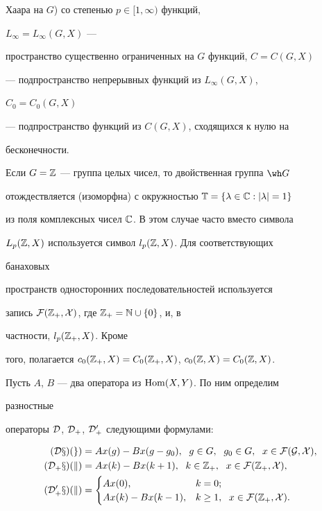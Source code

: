 Хаара на $G$) со степенью $p\in[1,\infty)$ функций, 


$L_\infty=L_\infty(G,X)$ --- 


пространство существенно ограниченных на $G$ функций, $C=C(G,X)$ 


--- подпространство непрерывных функций из $L_\infty(G,X)$, 


$C_0=C_0(G,X)$ 


--- подпространство функций из $C(G,X)$, сходящихся к нулю на 


бесконечности. 


 


Если $G=\Bbb Z$ --- группа целых чисел, то двойственная группа $\wh G$ 


отождествляется (изоморфна) с окружностью $\Bbb T=\{\lambda\in\Bbb 


C:|\lambda|=1\}$ 


из поля комплексных чисел $\Bbb C$. В этом случае часто вместо символа 


$L_p(\Bbb Z,X)$ используется символ $l_p(\Bbb Z,X)$. Для соответствующих 


банаховых 


пространств односторонних последовательностей используется 


запись $\cal F(\Bbb Z_+,X)$, где $\Bbb Z_+=\Bbb N\cup\{0\}$, и, в 


частности, $l_p(\Bbb Z_+,X)$. Кроме 


того, полагается $c_0(\Bbb Z_+,X)=C_0(\Bbb Z_+,X)$, $c_0(\Bbb 


Z,X)=C_0(\Bbb Z,X)$. 


 


Пусть $A$, $B$ --- два оператора из $\operatorname{Hom}(X,Y)$. По ним определим 


разностные 


операторы $\cal D$, $\cal D_+$, $\cal D^0_+$ следующими формулами: 


\begin{align*} 


(\cal D x)(g)&=A x(g)-B x(g-g_0),\ \; g\in G, 


\ \; g_0\in G,\ \; x\in\cal F(G,X), \\ 


(\cal D_+x)(k)&=A x(k)-B x(k+1),\ \; k\in \Bbb Z_+, 


\ \; x\in\cal F(\Bbb Z_+,X), \\ 


(\cal D^0_+x)(k)&= 


\begin{cases} 


A x(0), & k=0; \\ 


A x(k)-B x(k-1), & k\ge1,\ \; x\in\cal F(\Bbb Z_+,X). 


\end{cases} 


\end{align*} 


